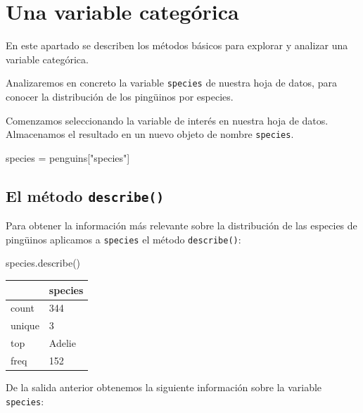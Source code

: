 \documentclass[
  a4paper,
  noprof,
  12pt,
  notoc,
  nosols,
  nobib]{mnye}
\newenvironment{Shaded}{\begin{snugshade}}{\end{snugshade}}
\newcommand{\NormalTok}[1]{\textcolor[rgb]{0.00,0.23,0.31}{#1}}
\newcommand{\OperatorTok}[1]{\textcolor[rgb]{0.37,0.37,0.37}{#1}}
\newcommand{\StringTok}[1]{\textcolor[rgb]{0.13,0.47,0.30}{#1}}
\theoremstyle{definition}
\theoremstyle{remark}
\begin{document}

\hypertarget{una-variable-categuxf3rica}{%
\section{Una variable categórica}\label{una-variable-categuxf3rica}}

En este apartado se describen los métodos básicos para explorar y
analizar una variable categórica.

Analizaremos en concreto la variable \texttt{species} de nuestra hoja de
datos, para conocer la distribución de los pingüinos por especies.

Comenzamos seleccionando la variable de interés en nuestra hoja de
datos. Almacenamos el resultado en un nuevo objeto de nombre
\texttt{species}.

\begin{Shaded}
\begin{Highlighting}[]
\NormalTok{species }\OperatorTok{=}\NormalTok{ penguins[}\StringTok{"species"}\NormalTok{]}
\end{Highlighting}
\end{Shaded}

\hypertarget{sec-1categorical-describe}{%
\subsection{\texorpdfstring{El método
\texttt{describe()}}{El método describe()}}\label{sec-1categorical-describe}}

Para obtener la información más relevante sobre la distribución de las
especies de pingüinos aplicamos a \texttt{species} el método
\texttt{describe()}:

\begin{Shaded}
\begin{Highlighting}[]
\NormalTok{species.describe()}
\end{Highlighting}
\end{Shaded}

\begin{tabular}{ll}
\toprule
{} & species \\
\midrule
count  &     344 \\
unique &       3 \\
top    &  Adelie \\
freq   &     152 \\
\bottomrule
\end{tabular}

De la salida anterior obtenemos la siguiente información sobre la
variable \texttt{species}:
\end{document}
